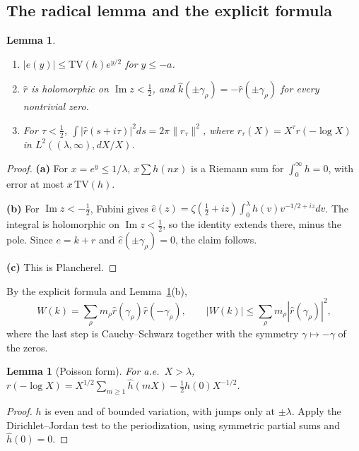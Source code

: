 \documentclass[11pt]{amsart}
\newtheorem{lemma}[proposition]{Lemma}
\theoremstyle{remark}
\numberwithin{equation}{section}
\begin{document}
\subsection{The radical lemma and the explicit formula}
\begin{lemma}\label{lem:L1}
\begin{enumerate}
\item[(a)] $|e(y)|\le\mathrm{TV}(h)e^{y/2}$ for $y\le-a$.
\item[(b)] $\hat r$ is holomorphic on $\operatorname{Im}z<\frac12$, and $\hat k(\pm\gamma_\rho)=-\hat r(\pm\gamma_\rho)$ for every nontrivial zero.
\item[(c)] For $\tau<\frac12$, $\int|\hat r(s+i\tau)|^2ds=2\pi\|r_\tau\|^2$, where $r_\tau(X)=X^\tau r(-\log X)$ in $L^2((\lambda,\infty),dX/X)$.
\end{enumerate}
\end{lemma}
\begin{proof}
\textbf{(a)} For $x=e^y\le1/\lambda$, $x\sum h(nx)$ is a Riemann sum for $\int_0^\infty h=0$, with error at most $x\,\mathrm{TV}(h)$.

\textbf{(b)} For $\operatorname{Im}z<-\frac12$, Fubini gives $\hat e(z)=\zeta(\frac12+iz)\int_0^\lambda h(v)v^{-1/2+iz}dv$. The integral is holomorphic on $\operatorname{Im}z<\frac12$, so the identity extends there, minus the pole. Since $e=k+r$ and $\hat e(\pm\gamma_\rho)=0$, the claim follows.

\textbf{(c)} This is Plancherel.
\end{proof}

By the explicit formula \cite[Lemma~3.2]{MoriWWUB} and Lemma~\ref{lem:L1}(b),
\begin{equation}\label{eq:W}
W(k)=\sum_\rho m_\rho\hat r(\gamma_\rho)\hat r(-\gamma_\rho),\qquad|W(k)|\le\sum_\rho m_\rho|\hat r(\gamma_\rho)|^2,
\end{equation}
where the last step is Cauchy--Schwarz together with the symmetry $\gamma\mapsto-\gamma$ of the zeros.

\begin{lemma}[Poisson form]\label{lem:P}
For a.e.\ $X>\lambda$, $r(-\log X)=X^{1/2}\sum_{m\ge1}\hat h(mX)-\frac12h(0)X^{-1/2}$.
\end{lemma}
\begin{proof}
$h$ is even and of bounded variation, with jumps only at $\pm\lambda$. Apply the Dirichlet--Jordan test to the periodization, using symmetric partial sums and $\hat h(0)=0$.
\end{proof}
\end{document}
